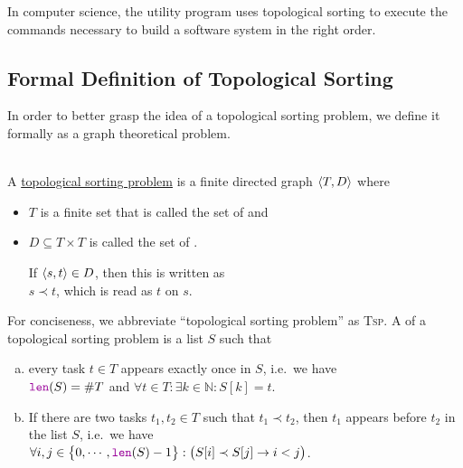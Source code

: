 In computer science, the utility program \href{https://edoras.sdsu.edu/doc/make.html}{} uses
topological sorting to execute the commands necessary to build a software system in the right order.

\subsection{Formal Definition of Topological Sorting}
In order to better grasp the idea of a topological sorting problem, we define it formally as a graph
theoretical problem.
\begin{Definition}  \hspace*{\fill} \\
  A \href{https://en.wikipedia.org/wiki/Topological_sorting}{topological sorting problem} is a finite directed graph
  $\pair(T, D)$ where
  \begin{itemize}
  \item $T$ is a finite set that is called the set of  and 
  \item $D \subseteq T \times T$ is called the set of .

        If $\pair(s, t) \in D$, then this is written as 
        \\[0.2cm]
        \hspace*{1.3cm}
        $s \prec t$, \quad which is read as $t$  on $s$.
  \end{itemize}
  For conciseness, we abbreviate ``topological sorting problem'' as \textsc{Tsp}.
  A  of a topological sorting problem is a list $S$ such that
  \begin{enumerate}[(a)]
  \item every task $t \in T$ appears exactly once in $S$, i.e.~we have
        \\[0.2cm]
        \hspace*{1.3cm}
        $\mytt{len}(S) = \#T$ \quad and \quad $\forall t \in T: \exists k \in \mathbb{N}: S[k] = t$.
\item If there are two tasks $t_1, t_2 \in T$ such that $t_1 \prec t_2$, then $t_1$ appears before $t_2$
        in the list $S$, i.e.~we have
        \\[0.2cm]
        \hspace*{1.3cm}
        $\forall i,j \in \bigl\{0,\cdots,\mytt{len}(S)-1\bigr\}:\bigl(S[i] \prec S[j] \rightarrow i < j\bigr)$.
        \eox
\end{enumerate}

\end{Definition}

